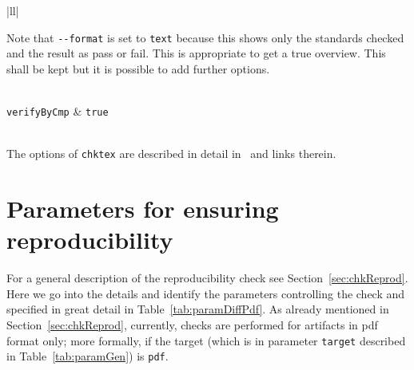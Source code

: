 \begin{longtable}{|ll|}
{\begin{minipage}{0.95\linewidth}
  Note that \texttt{-{}-format} is set to \texttt{text} 
  because this shows only the standards checked and the result as pass or fail. 
  This is appropriate to get a true overview. 
  This shall be kept but it is possible to add further options. 
  \end{minipage}
  } \\
  \texttt{verifyByCmp}      & \texttt{true}  \\
   \\
\end{longtable}

The options of \texttt{chktex} 
are described in detail in~\cite{VeraPdf} and links therein. 

\section{Parameters for ensuring reproducibility}\label{sec:paramRepro}

For a general description of the reproducibility check 
see Section~\ref{sec:chkReprod}. 
Here we go into the details and identify the parameters 
controlling the check 
and specified in great detail in Table~\ref{tab:paramDiffPdf}. 
As already mentioned in Section~\ref{sec:chkReprod}, 
currently, checks are performed for artifacts in pdf format only; 
more formally, if the target 
(which is in parameter \texttt{target} described in Table~\ref{tab:paramGen}) 
is \texttt{pdf}. 


